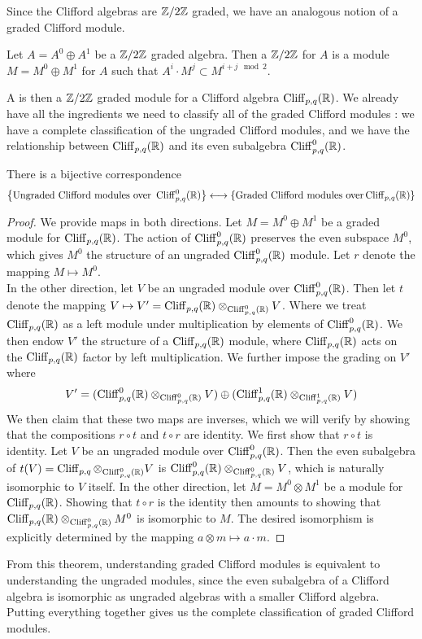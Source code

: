 Since the Clifford algebras are $\mathbb{Z}/2\mathbb{Z}$ graded, we have an analogous notion
of a graded Clifford module.
%
\begin{defn}
Let $A = A^0 \oplus A^1$ be a $\mathbb{Z}/2\mathbb{Z}$ graded algebra. Then a $\mathbb{Z}/2\mathbb{Z}$
 for $A$ is a module $M = M^0 \oplus M^1$ for $A$ such that
$A^i \cdot M^j \subset M^{i + j \mod 2}$.
\end{defn}
%
A  is then a $\mathbb{Z}/2\mathbb{Z}$ graded module for a Clifford
algebra $\operatorname{Cliff}_{p,q}(\mathbb{R})$. We already have all the ingredients we need
to classify all of the graded Clifford modules : we have a complete
classification of the ungraded Clifford modules, and we have the relationship
between $\operatorname{Cliff}_{p,q}(\mathbb{R})$ and its even subalgebra $\operatorname{Cliff}_{p,q}^0(\mathbb{R})$.
%
\begin{thm}
There is a bijective correspondence
\[
\left\lbrace \text{Ungraded Clifford modules over } \operatorname{Cliff}_{p,q}^0(\mathbb{R}) \right\rbrace \longleftrightarrow
\left\lbrace \text{Graded Clifford modules over} \operatorname{Cliff}_{p,q}(\mathbb{R}) \right\rbrace
\]
\end{thm}
%
\begin{proof}
We provide maps in both directions. Let $M = M^0 \oplus M^1$ be a graded
module for $\operatorname{Cliff}_{p,q}(\mathbb{R})$. The action of $\operatorname{Cliff}_{p,q}^0(\mathbb{R})$ preserves
the even subspace $M^0$, which gives $M^0$ the structure of an ungraded
$\operatorname{Cliff}_{p,q}^0(\mathbb{R})$ module. Let $r$ denote the mapping $M \mapsto M^0$. \\

In the other direction, let $V$ be an ungraded module over $\operatorname{Cliff}_{p,q}^0(\mathbb{R})$.
Then let $t$ denote the mapping
$V \mapsto V' = \operatorname{Cliff}_{p,q}(\mathbb{R}) \otimes_{\operatorname{Cliff}_{p,q}^0(\mathbb{R})} V$.
Where we treat $\operatorname{Cliff}_{p,q}(\mathbb{R})$ as a left module under multiplication by
elements of $\operatorname{Cliff}_{p,q}^0(\mathbb{R})$. We then endow $V'$ the structure of a
$\operatorname{Cliff}_{p,q}(\mathbb{R})$ module, where $\operatorname{Cliff}_{p,q}(\mathbb{R})$ acts on the $\operatorname{Cliff}_{p,q}(\mathbb{R})$
factor by left multiplication. We further impose the grading on $V'$ where
\[
V' = ( \operatorname{Cliff}^0_{p,q}(\mathbb{R}) \otimes_{\operatorname{Cliff}^0_{p,q}(\mathbb{R})} V) \oplus
(\operatorname{Cliff}^1_{p,q}(\mathbb{R}) \otimes_{\operatorname{Cliff}^1_{p,q}(\mathbb{R})} V)
\]
We then claim that these two maps are inverses, which we will verify by showing
that the compositions $r \circ t$ and $t \circ r$ are identity. We first show
that $r \circ t$ is identity. Let $V$ be an ungraded module over $\operatorname{Cliff}_{p,q}^0(\mathbb{R})$.
Then the even subalgebra of $t(V) = \operatorname{Cliff}_{p,q} \otimes_{\operatorname{Cliff}_{p,q}^0(\mathbb{R})} V$
is $\operatorname{Cliff}^0_{p,q}(\mathbb{R}) \otimes_{\operatorname{Cliff}^0_{p,q}(\mathbb{R})} V$, which is naturally isomorphic
to $V$ itself. In the other direction, let $M = M^0 \otimes M^1$ be a module for
$\operatorname{Cliff}_{p,q}(\mathbb{R})$. Showing that $t \circ r$ is the identity then amounts to showing
that $\operatorname{Cliff}_{p,q}(\mathbb{R}) \otimes_{\operatorname{Cliff}_{p,q}^0(\mathbb{R})} M^0$ is isomorphic to $M$.
The desired isomorphism is explicitly determined by the mapping
$a \otimes m \mapsto a \cdot m$.
\end{proof}
%
From this theorem, understanding graded Clifford modules is equivalent to understanding
the ungraded modules, since the even subalgebra of a Clifford algebra is isomorphic
as ungraded algebras with a smaller Clifford algebra. Putting everything together
gives us the complete classification of graded Clifford modules.
%